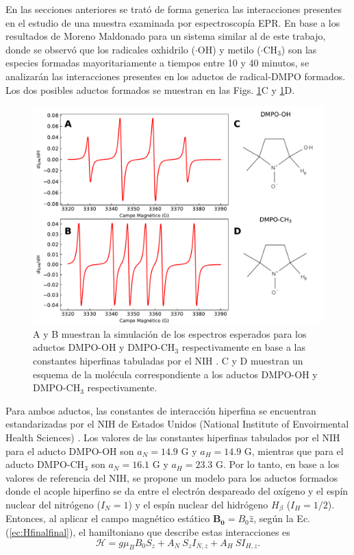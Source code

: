 \documentclass[aps,prl,reprint,superscriptaddress,showkeys]{revtex4-2}
\begin{document}
En las secciones anteriores se trató de forma generica las interacciones presentes en el estudio de una muestra examinada por espectroscopía EPR. En base a los resultados de Moreno Maldonado \cite{maldonado_actividad_nodate} para un sistema similar al de este trabajo, donde se observó que los radicales oxhidrilo ($\cdot$OH) y metilo ($\cdot$CH$_3$) son las especies formadas mayoritariamente a tiempos entre 10 y 40 minutos, se analizarán las interacciones presentes en los aductos de radical-DMPO formados. Los dos posibles aductos formados se muestran en las Figs. \ref*{fig:simulacion}C y \ref*{fig:simulacion}D. 

\begin{figure}[ht]
    \centering
    \includegraphics[width=0.95\linewidth]{simulacion.pdf}
    \caption{\centering  A y B muestran la simulación de los espectros esperados para los aductos DMPO-OH y DMPO-CH$_3$ respectivamente en base a las constantes hiperfinas tabuladas por el NIH \cite{nih}. C y D muestran un esquema de la molécula correspondiente a los aductos DMPO-OH y DMPO-CH$_3$ respectivamente.}
    \label{fig:simulacion}
\end{figure}

Para ambos aductos, las constantes de interacción hiperfina se encuentran estandarizadas por el NIH de Estados Unidos (National Institute of Envoirmental Health Sciences) \cite{nih}. Los valores de las constantes hiperfinas tabulados por el NIH para el aducto DMPO-OH son $a_N = 14.9$ G y $a_H = 14.9$ G, mientras que para el aducto DMPO-CH$_3$ son $a_N = 16.1$ G y $a_H = 23.3$ G. Por lo tanto, en base a los valores de referencia del NIH, se propone un modelo para los aductos formados donde el acople hiperfino se da entre el electrón despareado del oxígeno y el espín nuclear del nitrógeno ($I_N = 1$) y el espín nuclear del hidrógeno $H_\beta$ ($I_H=1/2$). Entonces, al aplicar el campo magnético estático $\mathbf{B_0} = B_0 \hat{z}$, según la Ec. (\ref*{ec:Hfinalfinal}), el hamiltoniano que describe estas interacciones es 
\begin{equation}
    \mathcal{H} = g \mu_B B_0 S_z + A_N ~ S_z I_{N,z} + A_H ~ S I_{H,z}.
    \label{ec:HDMSO}
\end{equation}
\end{document}
